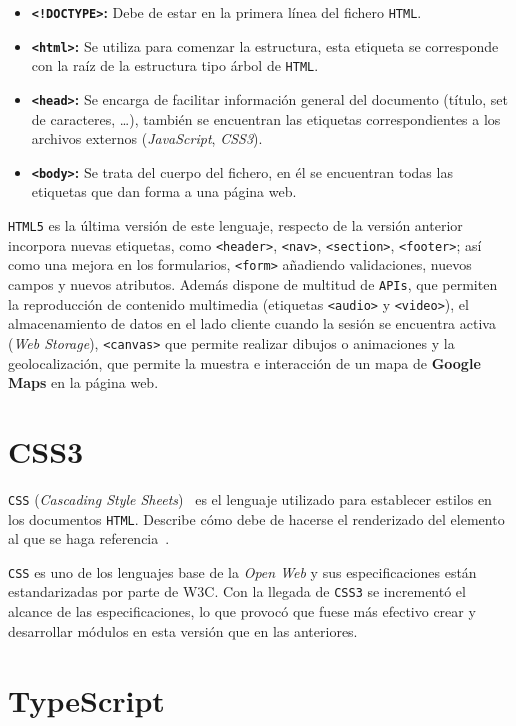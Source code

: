 \documentclass[a4paper, 12pt]{book}
\begin{document}
\begin{itemize}
	\item \textbf{\texttt{<!DOCTYPE>}:} Debe de estar en la primera línea del fichero \texttt{HTML}.
	\item \textbf{\texttt{<html>}:} Se utiliza para comenzar la estructura, esta etiqueta se corresponde con la raíz de la estructura tipo árbol de \texttt{HTML}.
	\item \textbf{\texttt{<head>}:} Se encarga de facilitar información general del documento (título, set de caracteres, \ldots), también se encuentran las etiquetas correspondientes a los archivos externos (\textit{JavaScript}, \textit{CSS3}).
	\item \textbf{\texttt{<body>}:} Se trata del cuerpo del fichero, en él se encuentran todas las etiquetas que dan forma a una página web.
\end{itemize}

\texttt{HTML5} es la última versión de este lenguaje, respecto de la versión anterior incorpora nuevas etiquetas, como \texttt{<header>}, \texttt{<nav>}, \texttt{<section>}, \texttt{<footer>}; así como una mejora en los formularios, \texttt{<form>} añadiendo validaciones, nuevos campos y nuevos atributos. Además dispone de multitud de \texttt{APIs}, que permiten la reproducción de contenido multimedia (etiquetas \texttt{<audio>} y \texttt{<video>}), el almacenamiento de datos en el lado cliente cuando la sesión se encuentra activa (\textit{Web Storage}), \texttt{<canvas>} que permite realizar dibujos o animaciones y la geolocalización, que permite la muestra e interacción de un mapa de \textbf{Google Maps} en la página web.

\section{CSS3}
\label{sec:css3}

\texttt{CSS} (\textit{Cascading Style Sheets})~\cite{mdncss} es el lenguaje utilizado para establecer estilos en los documentos \texttt{HTML}. Describe cómo debe de hacerse el renderizado del elemento al que se haga referencia~\cite{mdncss}.

\texttt{CSS} es uno de los lenguajes base de la \textit{Open Web} y sus especificaciones están estandarizadas por parte de W3C. Con la llegada de \texttt{CSS3} se incrementó el alcance de las especificaciones, lo que provocó que fuese más efectivo crear y desarrollar módulos en esta versión que en las anteriores.

\section{TypeScript}
\label{sec:typescript}
\end{document}
